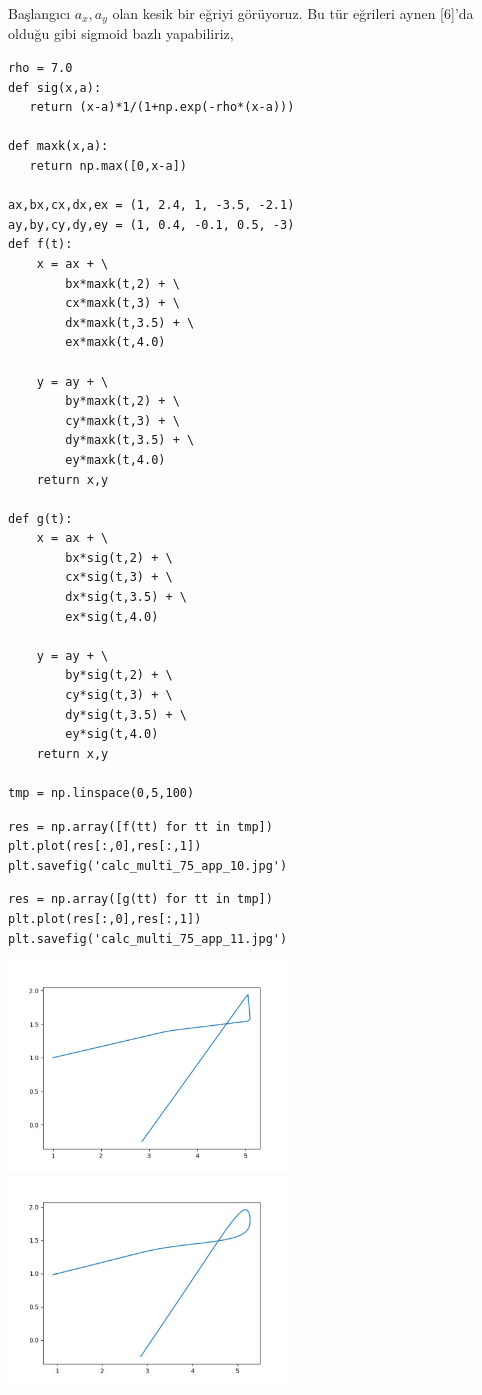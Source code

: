 \documentclass[12pt,fleqn]{article}\usepackage{../../common}
\begin{document}
Başlangıcı $a_x,a_y$ olan kesik bir eğriyi görüyoruz. Bu tür eğrileri aynen
[6]'da olduğu gibi sigmoid bazlı yapabiliriz,

\begin{verbatim}
rho = 7.0
def sig(x,a):
   return (x-a)*1/(1+np.exp(-rho*(x-a)))

def maxk(x,a):
   return np.max([0,x-a])

ax,bx,cx,dx,ex = (1, 2.4, 1, -3.5, -2.1)
ay,by,cy,dy,ey = (1, 0.4, -0.1, 0.5, -3)
def f(t):
    x = ax + \
        bx*maxk(t,2) + \
        cx*maxk(t,3) + \
        dx*maxk(t,3.5) + \
        ex*maxk(t,4.0)
	   
    y = ay + \
        by*maxk(t,2) + \
        cy*maxk(t,3) + \
        dy*maxk(t,3.5) + \
        ey*maxk(t,4.0)
    return x,y	   
    
def g(t):
    x = ax + \
        bx*sig(t,2) + \
        cx*sig(t,3) + \
        dx*sig(t,3.5) + \
        ex*sig(t,4.0)
	   
    y = ay + \
        by*sig(t,2) + \
        cy*sig(t,3) + \
        dy*sig(t,3.5) + \
        ey*sig(t,4.0)
    return x,y	   
    
tmp = np.linspace(0,5,100)
\end{verbatim}

\begin{verbatim}
res = np.array([f(tt) for tt in tmp])
plt.plot(res[:,0],res[:,1])
plt.savefig('calc_multi_75_app_10.jpg')
\end{verbatim}

\begin{verbatim}
res = np.array([g(tt) for tt in tmp])
plt.plot(res[:,0],res[:,1])
plt.savefig('calc_multi_75_app_11.jpg')
\end{verbatim}

\includegraphics[width=20em]{calc_multi_75_app_10.jpg}
\includegraphics[width=20em]{calc_multi_75_app_11.jpg}
\end{document}
